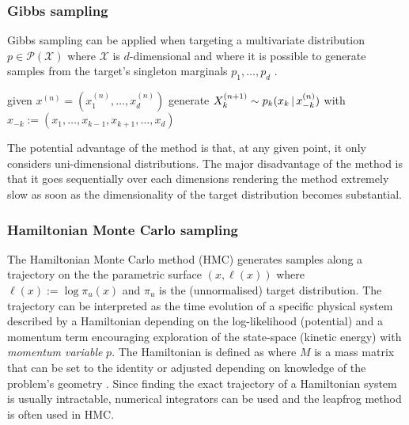 \subsubsection{Gibbs sampling}

Gibbs sampling can be applied when targeting a multivariate distribution $p\in \mathcal P(\mathcal X)$ where $\mathcal X$ is $d$-dimensional and where it is possible to generate samples from the target's singleton marginals $p_{1}, \dots, p_{d}$ \citep[chapter 7]{robert04}.

\begin{algorithm}[!h]\small
	\caption{\label{alg:gibbs-alg}}
	\begin{algorithmic}[1]
		\State given $x^{(n)}=(x_{1}^{(n)},\dots,x_{d}^{(n)})$
			\State generate $X^{(n+1)}_{k} \sim p_{k}(x_{k}\,|\, x^{(n)}_{-k})$ \Comment with $x_{-k}:=(x_{1},\dots,x_{k-1},x_{k+1},\dots,x_{d})$
		\EndFor
	\end{algorithmic}
\end{algorithm}

The potential advantage of the method is that, at any given point, it only considers uni-dimensional distributions. 
The major disadvantage of the method is that it goes sequentially over each dimensions rendering the method extremely slow as soon as the dimensionality of the target distribution becomes substantial.


\subsubsection{Hamiltonian Monte Carlo sampling}

The Hamiltonian Monte Carlo method (HMC) generates samples along a trajectory on the the parametric surface $(x, \ell(x))$ where $\ell(x):=\log \pi_{u}(x)$ and $\pi_{u}$ is the (unnormalised) target distribution.
The trajectory can be interpreted as the time evolution of a specific physical system described by a Hamiltonian depending on the log-likelihood (potential) and a momentum term encouraging exploration of the state-space (kinetic energy) with \emph{momentum variable} $p$. The Hamiltonian is defined as
where $M$ is a mass matrix that can be set to the identity or adjusted depending on knowledge of the problem's geometry \citep{betancourt17, barp18}. 
Since finding the exact trajectory of a Hamiltonian system is usually intractable, numerical integrators can be used and the leapfrog method is often used in HMC.

